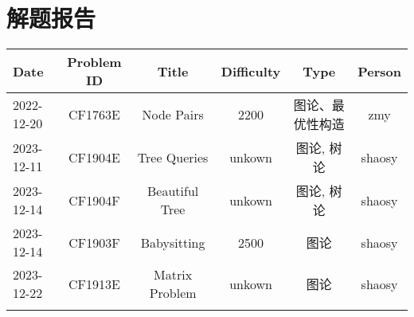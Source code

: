 \chapter{解题报告}
\begin{center}
\begin{longtable}{l c c c c c }

Date & Problem ID & Title & Difficulty & Type & Person   \\ 
\hline
2022-12-20 & CF1763E & Node Pairs & 2200 & 图论、最优性构造 & zmy  \\
2023-12-11 & CF1904E & Tree Queries & unkown & 图论, 树论 & shaosy \\
2023-12-14 & CF1904F & Beautiful Tree & unkown & 图论, 树论 & shaosy \\
2023-12-14 & CF1903F & Babysitting & 2500 & 图论 & shaosy \\
2023-12-22 & CF1913E & Matrix Problem & unkown & 图论 & shaosy \\
\hline

\label{tab:practice_index}
\end{longtable}
\end{center}

